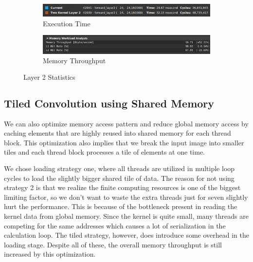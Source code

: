 \documentclass{article}
\begin{document}
\begin{figure}[H]
    \centering
    \begin{subfigure}[b]{\linewidth}
        \includegraphics[width=\linewidth]{const_layer2_runtime}
        \caption{Execution Time}
    \end{subfigure}
    \begin{subfigure}[b]{\linewidth}
        \includegraphics[width=\linewidth]{const_layer2_mem}
        \caption{Memory Throughput}
    \end{subfigure}
    \caption{Layer 2 Statistics}
\end{figure}


\subsection{Tiled Convolution using Shared Memory}
We can also optimize memory access pattern and reduce global memory access by caching
elements that are highly reused into shared memory for each thread block.
This optimization also implies that we break the input image into smaller tiles
and each thread block processes a tile of elements at one time. \\

\par
We chose loading strategy one, where all threads are utilized in multiple loop
cycles to load the slightly bigger shared tile of data. The reason for not using
strategy 2 is that we realize the finite computing resources is one of the
biggest limiting factor, so we don't want to waste the extra threads just for
seven slightly hurt the performance. This is because of the bottleneck present
in reading the kernel data from global memory. Since the kernel is quite small,
many threads are competing for the same addresses which causes a lot of serialization
in the calculation loop. The tiled strategy, however, does introduce some overhead
in the loading stage. Despite all of these, the overall memory throughput is still
increased by this optimization.
\end{document}
